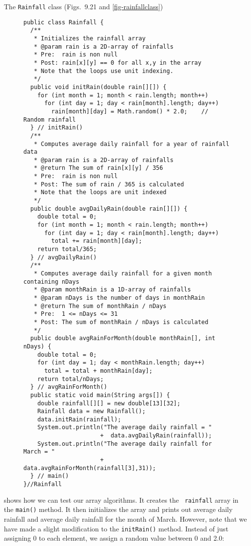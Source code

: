 \noindent The {\tt Rainfall} class (Figs.~9.21 and \ref{fig-rainfallclass})
\begin{figure}[htb]
\label{fig-p440f1}
\label{pg-fig-p440f1}
\end{figure}
\begin{figure}[p!]
\jjjprogstart
\begin{jjjlisting}[32pc]
\begin{lstlisting}
public class Rainfall {
  /**
   * Initializes the rainfall array
   * @param rain is a 2D-array of rainfalls
   * Pre:  rain is non null
   * Post: rain[x][y] == 0 for all x,y in the array
   * Note that the loops use unit indexing.
   */
  public void initRain(double rain[][]) {
    for (int month = 1; month < rain.length; month++)
      for (int day = 1; day < rain[month].length; day++)
        rain[month][day] = Math.random() * 2.0;    // Random rainfall
  } // initRain()
  /**
   * Computes average daily rainfall for a year of rainfall data
   * @param rain is a 2D-array of rainfalls
   * @return The sum of rain[x][y] / 356
   * Pre:  rain is non null
   * Post: The sum of rain / 365 is calculated
   * Note that the loops are unit indexed
   */
  public double avgDailyRain(double rain[][]) {
    double total = 0;
    for (int month = 1; month < rain.length; month++)
      for (int day = 1; day < rain[month].length; day++)
        total += rain[month][day];
    return total/365;
  } // avgDailyRain()
  /**
   * Computes average daily rainfall for a given month containing nDays
   * @param monthRain is a 1D-array of rainfalls
   * @param nDays is the number of days in monthRain
   * @return The sum of monthRain / nDays
   * Pre:  1 <= nDays <= 31
   * Post: The sum of monthRain / nDays is calculated
   */
  public double avgRainForMonth(double monthRain[], int nDays) {
    double total = 0;
    for (int day = 1; day < monthRain.length; day++)
      total = total + monthRain[day];
    return total/nDays;
  } // avgRainForMonth()
  public static void main(String args[]) {
    double rainfall[][] = new double[13][32];
    Rainfall data = new Rainfall();
    data.initRain(rainfall);
    System.out.println("The average daily rainfall = " 
                      +  data.avgDailyRain(rainfall));
    System.out.println("The average daily rainfall for March = " 
                      +  data.avgRainForMonth(rainfall[3],31));
  } // main()
}//Rainfall
\end{lstlisting}
\end{jjjlisting}
\end{figure}
shows how we can test our array algorithms.  It creates the {\tt
rainfall} array in the {\tt main()} method.  It then initializes the
array and prints out average daily rainfall and average daily rainfall
for the month of March.  However, note that we have made a slight
modification to the {\tt initRain()} method.  Instead of just
assigning 0 to each element, we assign a random value between 0 and
2.0:


